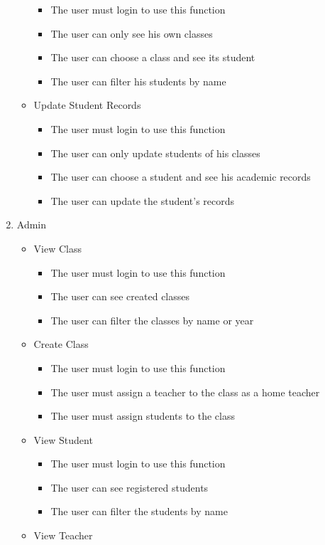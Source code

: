 \documentclass[
  letterpaper,
  DIV=11,
  numbers=noendperiod]{scrreprt}
\providecommand{\tightlist}{%
  \setlength{\itemsep}{0pt}\setlength{\parskip}{0pt}}\usepackage{longtable,booktabs,array}
\begin{document}
\begin{enumerate}
\begin{itemize}
    \begin{itemize}
    \tightlist
    \item
      The user must login to use this function
    \item
      The user can only see his own classes
    \item
      The user can choose a class and see its student
    \item
      The user can filter his students by name
    \end{itemize}
  \item
    Update Student Records

    \begin{itemize}
    \tightlist
    \item
      The user must login to use this function
    \item
      The user can only update students of his classes
    \item
      The user can choose a student and see his academic records
    \item
      The user can update the student's records
    \end{itemize}
  \end{itemize}
\item
  Admin

  \begin{itemize}
  \tightlist
  \item
    View Class

    \begin{itemize}
    \tightlist
    \item
      The user must login to use this function
    \item
      The user can see created classes
    \item
      The user can filter the classes by name or year
    \end{itemize}
  \item
    Create Class

    \begin{itemize}
    \tightlist
    \item
      The user must login to use this function
    \item
      The user must assign a teacher to the class as a home teacher
    \item
      The user must assign students to the class
    \end{itemize}
  \item
    View Student

    \begin{itemize}
    \tightlist
    \item
      The user must login to use this function
    \item
      The user can see registered students
    \item
      The user can filter the students by name
    \end{itemize}
  \item
    View Teacher


\end{itemize}
\end{enumerate}
\end{document}
